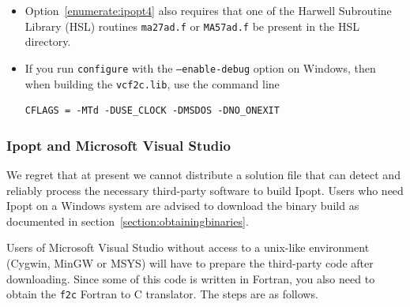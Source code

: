 \documentclass[11pt]{article}
\renewcommand{\_}{{\char"5F}}
\renewcommand{\{}{{\char"7B}}
\renewcommand{\}}{{\char"7D}}
\renewcommand{\^}{{\char"0D}}
\renewcommand{\'}{{\char"0D}}
\newif\ifipopt  \ipopttrue      %
\begin{document}
\begin{itemize}
\item Option~\ref{enumerate:ipopt4} also requires that one of the Harwell Subroutine Library (HSL) routines
{\tt ma27ad.f} or {\tt MA57ad.f} be present in the HSL directory.

\item If you run {\tt configure} with the {\tt --enable-debug} option on Windows, then when building the {\tt vcf2c.lib}, use the command line

\begin{verbatim}
CFLAGS = -MTd -DUSE_CLOCK -DMSDOS -DNO_ONEXIT
\end{verbatim}

\end{itemize}
%

\vskip 8pt

\ifipopt
\subsubsection{Ipopt and Microsoft Visual Studio} \label{section:ipopt-msvs}

We regret that at present we cannot distribute a solution file
that can detect and reliably process the necessary third-party software to
build Ipopt. Users who need Ipopt on a Windows system are advised to download
the binary build as documented in section~\ref{section:obtainingbinaries}.


\iffalse %
Users of Microsoft Visual Studio without access to a unix-like environment (Cygwin, MinGW or MSYS)
will have to prepare the third-party code after downloading. Since some of this code is written in Fortran,
you also need to obtain the {\tt f2c} Fortran to C translator. The steps are as follows.
\end{document}
